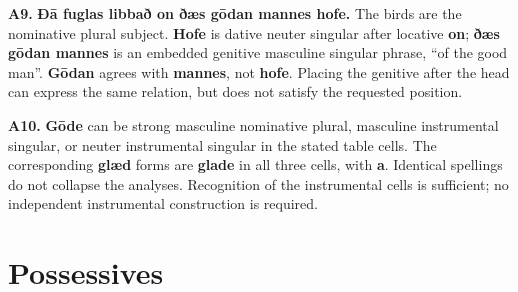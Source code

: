 \par\begin{minipage}{\linewidth}\raggedright
\textbf{A9.} \textbf{Ðā fuglas libbað on ðæs gōdan mannes hofe.} The birds are the nominative plural subject. \textbf{Hofe} is dative neuter singular after locative \textbf{on}; \textbf{ðæs gōdan mannes} is an embedded genitive masculine singular phrase, “of the good man”. \textbf{Gōdan} agrees with \textbf{mannes}, not \textbf{hofe}. Placing the genitive after the head can express the same relation, but does not satisfy the requested position.

\end{minipage}\par\addvspace{4pt}

\par\begin{minipage}{\linewidth}\raggedright
\textbf{A10.} \textbf{Gōde} can be strong masculine nominative plural, masculine instrumental singular, or neuter instrumental singular in the stated table cells. The corresponding \textbf{glæd} forms are \textbf{glade} in all three cells, with \textbf{a}. Identical spellings do not collapse the analyses. Recognition of the instrumental cells is sufficient; no independent instrumental construction is required.

\end{minipage}\par\addvspace{4pt}

\section*{Possessives}

